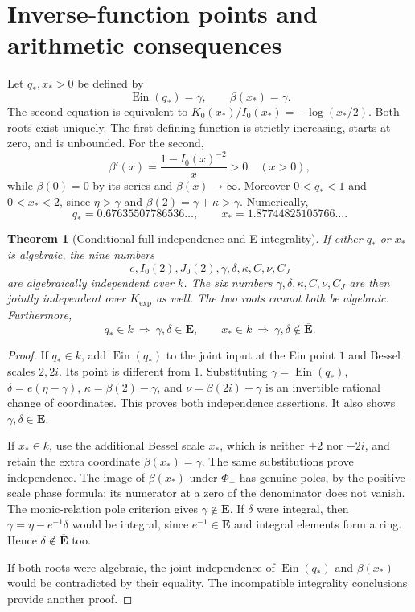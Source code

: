 \documentclass[11pt]{article}
\newtheorem{theorem}{Theorem}[section]
\theoremstyle{definition}
\theoremstyle{remark}
\newcommand{\Ein}{\operatorname{Ein}}
\newcommand{\Kexp}{K_{\mathrm{exp}}}
\begin{document}
\section{Inverse-function points and arithmetic consequences}
Let $q_*,x_*>0$ be defined by
\[
 \Ein(q_*)=\gamma,\qquad \beta(x_*)=\gamma.
\]
The second equation is equivalent to
$K_0(x_*)/I_0(x_*)=-\log(x_*/2)$.
Both roots exist uniquely. The first defining function is strictly
increasing, starts at zero, and is unbounded. For the second,
\[
 \beta'(x)=\frac{1-I_0(x)^{-2}}{x}>0\quad(x>0),
\]
while $\beta(0)=0$ by its series and $\beta(x)\to\infty$.
Moreover $0<q_*<1$ and $0<x_*<2$, since
$\eta>\gamma$ and $\beta(2)=\gamma+\kappa>\gamma$.
Numerically,
\[
 q_*=0.67635507786536\ldots,\qquad
 x_*=1.87744825105766\ldots.
\]

\begin{theorem}[Conditional full independence and E-integrality]
\label{thm:roots}
If either $q_*$ or $x_*$ is algebraic, the nine numbers
\[
 e,I_0(2),J_0(2),\gamma,\delta,\kappa,C,\nu,C_J
\]
are algebraically independent over $k$. The six numbers
$\gamma,\delta,\kappa,C,\nu,C_J$ are then jointly independent
over $\Kexp$ as well. The two roots cannot both be algebraic.
Furthermore,
\[
 q_*\in k\ \Longrightarrow\ \gamma,\delta\in\mathbf E,
 \qquad
 x_*\in k\ \Longrightarrow\ \gamma,\delta\notin\overline{\mathbf E}.
\]
\end{theorem}
\begin{proof}
If $q_*\in k$, add $\Ein(q_*)$ to the joint input at the
Ein point $1$ and Bessel scales $2,2i$. Its point is different from
$1$. Substituting $\gamma=\Ein(q_*)$,
$\delta=e(\eta-\gamma)$, $\kappa=\beta(2)-\gamma$, and
$\nu=\beta(2i)-\gamma$ is an invertible rational change of
coordinates. This proves both independence assertions. It also
shows $\gamma,\delta\in\mathbf E$.

If $x_*\in k$, use the additional Bessel scale $x_*$, which is
neither $\pm2$ nor $\pm2i$, and retain the extra coordinate
$\beta(x_*)=\gamma$. The same substitutions prove independence.
The image of $\beta(x_*)$ under $\Phi_-$ has genuine poles, by
the positive-scale phase formula; its numerator at a
zero of the denominator does not vanish. The monic-relation pole
criterion gives $\gamma\notin\overline{\mathbf E}$. If $\delta$ were integral,
then $\gamma=\eta-e^{-1}\delta$ would be integral, since
$e^{-1}\in\mathbf E$ and integral elements form a ring. Hence
$\delta\notin\overline{\mathbf E}$ too.

If both roots were algebraic, the joint independence of
$\Ein(q_*)$ and $\beta(x_*)$ would be contradicted by their equality.
The incompatible integrality conclusions provide another proof.
\end{proof}
\end{document}
